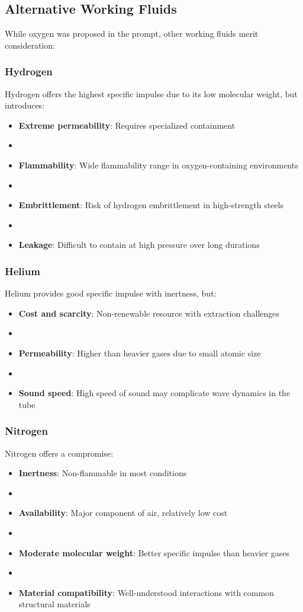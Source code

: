 \subsection{Alternative Working Fluids}
While oxygen was proposed in the prompt, other working fluids merit consideration:

\subsubsection{Hydrogen}
Hydrogen offers the highest specific impulse due to its low molecular weight, but introduces:
\begin{itemize}
    \item \textbf{Extreme permeability}: Requires specialized containment
    \item \item \textbf{Flammability}: Wide flammability range in oxygen-containing environments
    \item \item \textbf{Embrittlement}: Risk of hydrogen embrittlement in high-strength steels
    \item \item \textbf{Leakage}: Difficult to contain at high pressure over long durations
\end{itemize}

\subsubsection{Helium}
Helium provides good specific impulse with inertness, but:
\begin{itemize}
    \item \textbf{Cost and scarcity}: Non-renewable resource with extraction challenges
    \item \item \textbf{Permeability}: Higher than heavier gases due to small atomic size
    \item \item \textbf{Sound speed}: High speed of sound may complicate wave dynamics in the tube
\end{itemize}

\subsubsection{Nitrogen}
Nitrogen offers a compromise:
\begin{itemize}
    \item \textbf{Inertness}: Non-flammable in most conditions
    \item \item \textbf{Availability}: Major component of air, relatively low cost
    \item \item \textbf{Moderate molecular weight}: Better specific impulse than heavier gases
    \item \item \textbf{Material compatibility}: Well-understood interactions with common structural materials
\end{itemize}

